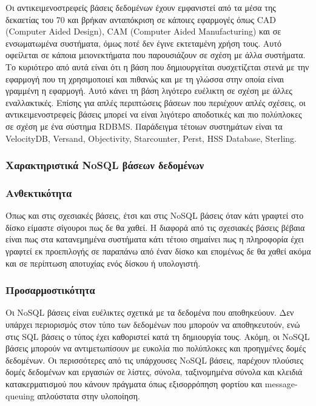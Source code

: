 		Οι αντικειμενοστρεφείς βάσεις δεδομένων έχουν εμφανιστεί από τα μέσα της δεκαετίας του 70 και βρήκαν ανταπόκριση σε κάποιες εφαρμογές όπως CAD (Computer Aided Design), CAM (Computer Aided Manufacturing) και σε ενσωματωμένα συστήματα, όμως ποτέ δεν έγινε εκτεταμένη χρήση τους. Αυτό οφείλεται σε κάποια μειονεκτήματα που παρουσιάζουν σε σχέση με άλλα συστήματα. Το κυριότερο από αυτά είναι ότι η βάση που δημιουργείται συσχετίζεται στενά με την εφαρμογή που τη χρησιμοποιεί και πιθανώς και με τη γλώσσα στην οποία είναι γραμμένη η εφαρμογή. Αυτό κάνει τη βάση λιγότερο ευέλικτη σε σχέση με άλλες εναλλακτικές. Επίσης για απλές περιπτώσεις βάσεων που περιέχουν απλές σχέσεις, οι αντικειμενοστρεφείς βάσεις μπορεί να είναι λιγότερο αποδοτικές και πιο πολύπλοκες σε σχέση με ένα σύστημα RDBMS. Παράδειγμα τέτοιων συστημάτων είναι τα VelocityDB, Versand, Objectivity, Starcounter, Perst, HSS Database, Sterling\cite{bertino1997object}\cite{kim1990introduction}\cite{kim2014object}\cite{leavitt2000whatever}.
		
		\subsubsection{Χαρακτηριστικά NoSQL βάσεων δεδομένων}
		
		\subsubsection{Ανθεκτικότητα}
		Όπως και στις σχεσιακές βάσεις, έτσι και στις NoSQL βάσεις όταν κάτι γραφτεί στο δίσκο είμαστε σίγουροι πως δε θα χαθεί. Η διαφορά από τις σχεσιακές βάσεις βέβαια είναι πως στα κατανεμημένα συστήματα κάτι τέτοιο σημαίνει πως η πληροφορία έχει γραφτεί εκ προεπιλογής σε παραπάνω από έναν δίσκο και επομένως δε θα χαθεί ακόμα και σε περίπτωση αποτυχίας ενός δίσκου ή υπολογιστή\cite{schindler2012characteristics}\cite{stonebraker2010sql}.
		
		\subsubsection{Προσαρμοστικότητα}
		Οι NoSQL βάσεις είναι ευέλικτες σχετικά με τα δεδομένα που αποθηκεύουν. Δεν υπάρχει περιορισμός στον τύπο των δεδομένων που μπορούν να αποθηκευτούν, ενώ στις SQL βάσεις ο τύπος έχει καθοριστεί κατά τη δημιουργία τους. Ακόμη, οι NoSQL βάσεις μπορούν να αντιμετωπίσουν με ευκολία πιο πολύπλοκες και προηγμένες δομές δεδομένων. Οι περισσότερες από τις υπάρχουσες NoSQL βάσεις, παρέχουν πλούσιες δομές δεδομένων και εργασιών σε λίστες, σύνολα, ταξινομημένα σύνολα και κλειδιά κατακερματισμού που κάνουν πράγματα όπως εξισορρόπηση φορτίου και message-queuing απλούστατα στην υλοποίηση\cite{stonebraker2010sql}\cite{grazioli2014mapping}.
		
